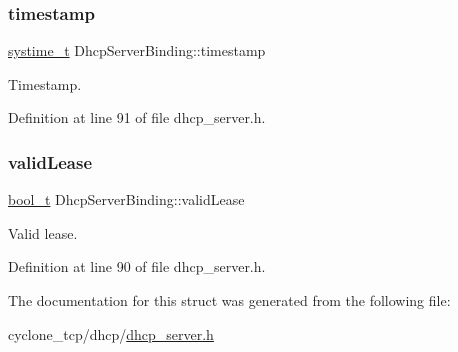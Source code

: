 \subsubsection{\texorpdfstring{timestamp}{timestamp}}
{\footnotesize\ttfamily \hyperlink{compiler__port_8h_ae3e32a98d431a02106616da3071832dd}{systime\+\_\+t} Dhcp\+Server\+Binding\+::timestamp}



Timestamp. 



Definition at line 91 of file dhcp\+\_\+server.\+h.

\mbox{\label{structDhcpServerBinding_a3f86ea591925b77ded04d37e424ab3d9}} 
\subsubsection{\texorpdfstring{valid\+Lease}{validLease}}
{\footnotesize\ttfamily \hyperlink{compiler__port_8h_a812d16e5494522586b3784e55d479912}{bool\+\_\+t} Dhcp\+Server\+Binding\+::valid\+Lease}



Valid lease. 



Definition at line 90 of file dhcp\+\_\+server.\+h.



The documentation for this struct was generated from the following file\+:\begin{DoxyCompactItemize}
\item 
cyclone\+\_\+tcp/dhcp/\hyperlink{dhcp__server_8h}{dhcp\+\_\+server.\+h}\end{DoxyCompactItemize}
